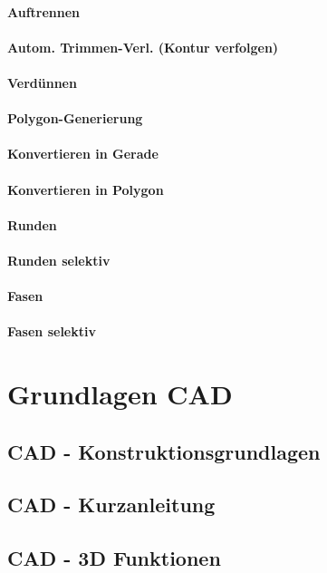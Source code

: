 \documentclass[a4paper]{book}
\begin{document}
			\subsubsection{Auftrennen} 
			\subsubsection{Autom. Trimmen-Verl. (Kontur verfolgen)} 
			\subsubsection{Verdünnen} 
			\subsubsection{Polygon-Generierung} 
			\subsubsection{Konvertieren in Gerade} 
			\subsubsection{Konvertieren in Polygon}
			\subsubsection{Runden} 
			\subsubsection{Runden selektiv} 
			\subsubsection{Fasen} 
			\subsubsection{Fasen selektiv} 
						
\chapter{Grundlagen CAD}
	\section{CAD - Konstruktionsgrundlagen}
	\section{CAD - Kurzanleitung}
	\section{CAD - 3D Funktionen}
\end{document}
